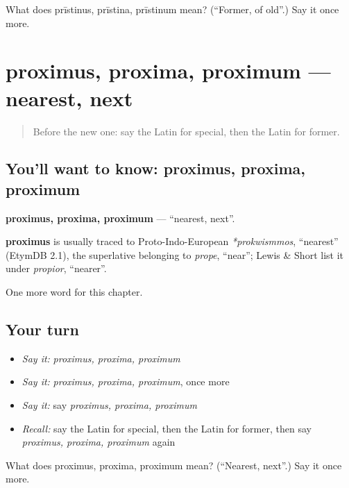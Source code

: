 \begin{tcolorbox}[breakable,colback=teal!4,colframe=teal!35!black,title={Before you move on}]
What does prīstinus, prīstina, prīstinum mean? (\textquotedblleft{}Former, of old\textquotedblright{}.) Say it once more.
\end{tcolorbox}
\section[proximus, proxima, proximum]{proximus, proxima, proximum — nearest, next}

\label{lesson:LA-C267-proximus}



\begin{quote}
Before the new one: say the Latin for special, then the Latin for former.
\end{quote}

\subsection*{You'll want to know: proximus, proxima, proximum}
\textbf{proximus, proxima, proximum} — \textquotedblleft{}nearest, next\textquotedblright{}.

\begin{cousinweb}
\textbf{proximus} is usually traced to Proto-Indo-European \emph{*prokwismmos}, \textquotedblleft{}nearest\textquotedblright{} (EtymDB 2.1), the superlative belonging to \emph{prope}, \textquotedblleft{}near\textquotedblright{}; Lewis \& Short list it under \emph{propior}, \textquotedblleft{}nearer\textquotedblright{}.
\end{cousinweb}

\begin{grammarlens}[title={What you've built}]
One more word for this chapter.
\end{grammarlens}

\subsection*{Your turn}
\begin{itemize}
\raggedright
  \item \emph{Say it:} \emph{proximus, proxima, proximum}
  \item \emph{Say it:} \emph{proximus, proxima, proximum}, once more
  \item \emph{Say it:} say \emph{proximus, proxima, proximum}
  \item \emph{Recall:} say the Latin for special, then the Latin for former, then say \emph{proximus, proxima, proximum} again
\end{itemize}

\begin{tcolorbox}[breakable,colback=teal!4,colframe=teal!35!black,title={Before you move on}]
What does proximus, proxima, proximum mean? (\textquotedblleft{}Nearest, next\textquotedblright{}.) Say it once more.
\end{tcolorbox}
